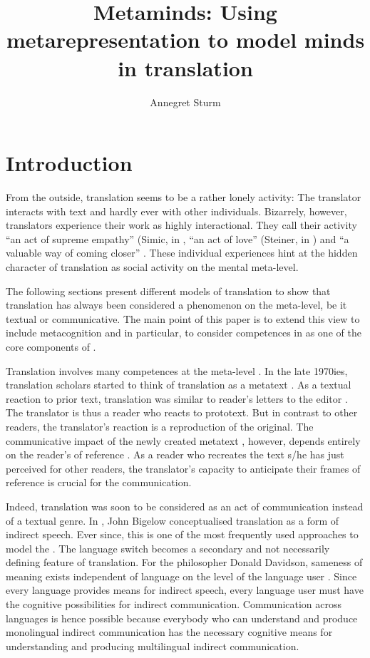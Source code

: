 \documentclass[output=paper]{LSP/langsci}
\author{Annegret Sturm
\affiliation{University of Geneva}
}
\title{Metaminds: Using metarepresentation to model minds in translation}
\begin{document}
\section{Introduction}

From the outside, translation seems to be a rather lonely activity: The translator interacts with text and hardly ever with other individuals. Bizarrely, however, translators experience their work as highly interactional. They call their activity ``an act of supreme empathy'' (Simic, in \citet[107]{Kelly2012}, ``an act of love'' (Steiner, in \citealt[213]{Kelly2012}) and ``a valuable way of coming closer'' \citep[119]{Bassnett2002}. These individual experiences hint at the hidden character of translation as social activity on the mental meta-level.  


The following sections present different models of translation to show that translation has always been considered a phenomenon on the meta-level, be it textual or communicative. The main point of this paper is to extend this view to include metacognition and in particular, to consider competences in  as one of the core components of .


Translation involves many competences at the meta-level \citep{Plassard2007}. In the late 1970ies, translation scholars started to think of translation as a metatext \citep{Popovic1976}. As a textual reaction to prior text, translation was similar to reader's letters to the editor \citep[232]{Popovic1976}. The translator is thus a reader who reacts to prototext. But in contrast to other readers, the translator's reaction is a reproduction of the original. The communicative impact of the newly created metatext , however, depends entirely on the reader's  of reference \citep[230]{Popovic1976}. As a reader who recreates the text s/he has just perceived for other readers, the translator's capacity to anticipate their frames of reference is crucial for the communication. 


Indeed, translation was soon to be considered as an act of communication instead of a textual genre.  In \citeyear{Bigelow1978}, John Bigelow conceptualised translation as a form of indirect speech. Ever since, this is one of the most frequently used approaches to model the . The language switch becomes a secondary and not necessarily defining feature of translation. For the philosopher Donald Davidson, sameness of meaning exists independent of language on the level of the language user \citep[125]{Davidson2010}. Since every language provides means for indirect speech, every language user must have the cognitive possibilities for  indirect communication. Communication across languages is hence possible because everybody who can understand and produce monolingual indirect communication has the necessary cognitive means for understanding and producing multilingual indirect communication.
\end{document}
